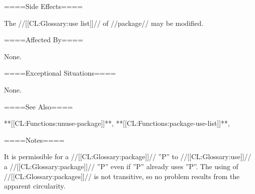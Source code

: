 ====Side Effects====

The //[[CL:Glossary:use list]]// of //package// may be modified.

====Affected By====

None.

====Exceptional Situations====

None.

====See Also====

**[[CL:Functions:unuse-package]]**, **[[CL:Functions:package-use-list]]**, {\secref\PackageConcepts}

====Notes====

It is permissible for a //[[CL:Glossary:package]]// ''P'' to //[[CL:Glossary:use]]// a //[[CL:Glossary:package]]// ''P'' even if ''P'' already uses ''P''. The using of //[[CL:Glossary:packages]]// is not transitive, so no problem results from the apparent circularity.

